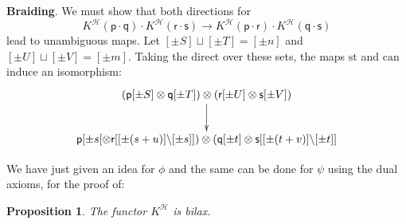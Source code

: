 \documentclass[11pt,reqno]{amsart}
\numberwithin{equation}{section}
\newtheorem{prop}[theorem]{Proposition}
\def\H{{\mathcal{H}}}
\def\p{{\textsf{p}}}
\def\q{{\textsf{q}}}
\def\r{{\textsf{r}}}
\def\s{{\textsf{s}}}
\def\KB{K^{\H}}
\def\pms{\pm s}
\def\pmt{\pm t}
\def\pmS{\pm S}
\def\pmT{\pm T}
\def\pmU{\pm U}
\def\pmV{\pm V}
\def\can{\mathrm{can}}
\def\st{\mathrm{st}}
\def\can{\mathrm{can}}
\begin{document}
{\bf Braiding}.
We must show that both directions for
$$\KB(\p\cdot\q)\cdot\KB(\r\cdot\s)\rightarrow\KB(\p\cdot\r)\cdot\KB(\q\cdot\s)$$
lead to unambiguous maps. Let $[\pm S]\sqcup [\pm T]=[\pm n]$ and $[\pm U]\sqcup [\pm V]=[\pm m]$. Taking the direct over these sets, the maps $\st$ and $\can$ induce an isomorphism:
$$\xymatrix{(\p[\pmS]\otimes\q[\pmT])\otimes(\r[\pmU]\otimes\s[\pmV])\ar[d] \\ 
\p[\pms[\otimes\r[[\pm (s+u)]\backslash [\pms]])\otimes (\q[\pmt]\otimes \s[[\pm (t+v)]\backslash [\pmt]]}$$

We have just given an idea for $\phi$ and the same can be done for $\psi$ using the dual axioms, for the proof of:


\begin{prop}
The functor $\KB$ is bilax. 
\end{prop}

\end{document}
